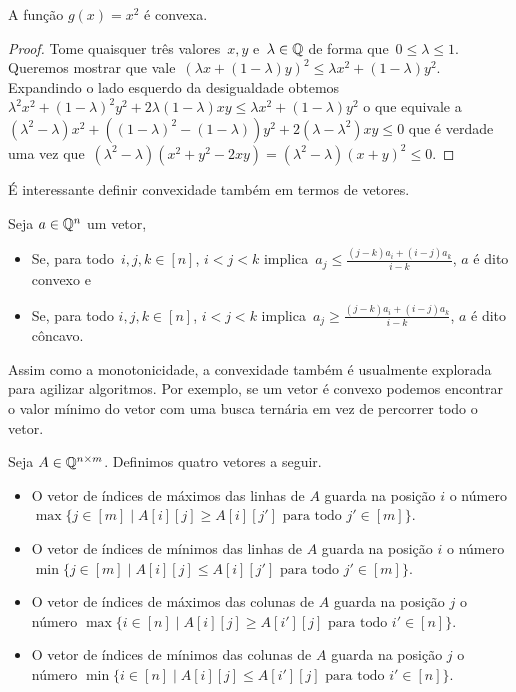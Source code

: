 \begin{prop} \label{Monge:sqConv}
A função $g(x) = x^2$ é convexa. 
\end{prop}

\begin{proof}
Tome quaisquer três valores~$x,y$ e~$\lambda \in \mathbb{Q}$ de forma que~${ 0 \leq \lambda \leq 1 }$. Queremos mostrar que vale~${ (\lambda x + (1 - \lambda)y)^2 \leq \lambda x^2 + (1 - \lambda) y^2 }$. Expandindo o lado esquerdo da desigualdade obtemos~${ \lambda^2x^2 + (1 - \lambda)^2y^2 + 2\lambda(1-\lambda)xy \leq \lambda x^2 + (1 - \lambda)y^2 }$ o que equivale a~${ (\lambda^2 - \lambda)x^2 + ((1-\lambda)^2 - (1 - \lambda))y^2 + 2(\lambda - \lambda^2)xy \leq 0 }$ que é verdade uma vez que~${ (\lambda^2 - \lambda)(x^2 + y^2 - 2xy) = (\lambda^2 - \lambda)(x + y)^2 \leq 0 }$.
\end{proof}

É interessante definir convexidade também em termos de vetores.

\begin{defi}
Seja $a \in \mathbb{Q}^n$ um vetor,
\begin{itemize}
    \item Se, para todo~$i,j,k \in [n]$, $i < j < k$ implica~$a_j \leq \frac{(j-k)a_i + (i-j)a_k}{i-k}$, $a$ é dito convexo e
    \item Se, para todo $i,j,k \in [n]$, $i < j < k$ implica~$a_j \geq \frac{(j-k)a_i + (i-j)a_k}{i-k}$, $a$ é dito côncavo.
\end{itemize}
\end{defi}

Assim como a monotonicidade, a convexidade também é usualmente explorada para agilizar algoritmos. Por exemplo, se um vetor é convexo podemos encontrar o valor mínimo do vetor com uma busca ternária em vez de percorrer todo o vetor.  

\begin{defi}
Seja $A \in \mathbb{Q}^{n \times m}$. Definimos quatro vetores a seguir.
\begin{itemize}
    \item O vetor de índices de máximos das linhas de $A$ guarda na posição $i$ 
          o número $\max\{j \in [m] \mid A[i][j] \geq A[i][j'] \text{ para todo } j' \in [m]\}$. 
    \item O vetor de índices de mínimos das linhas de $A$ guarda na posição $i$ 
          o número $\min\{j \in [m] \mid A[i][j] \leq A[i][j'] \text{ para todo } j' \in [m]\}$. 
    \item O vetor de índices de máximos das colunas de $A$ guarda na posição $j$ 
          o número $\max\{i \in [n] \mid A[i][j] \geq A[i'][j] \text{ para todo } i' \in [n]\}$. 
    \item O vetor de índices de mínimos das colunas de $A$ guarda na posição $j$ 
          o número $\min\{i \in [n] \mid A[i][j] \leq A[i'][j] \text{ para todo } i' \in [n]\}$. 
\end{itemize}
\end{defi}

